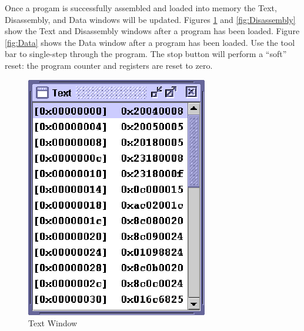 \documentclass[]{spie}
\begin{document}
Once a progam is successfully assembled and loaded into memory the Text, Disassembly, and Data windows will be updated.
Figures \ref{fig:Text} and \ref{fig:Disassembly} show the Text and Disassembly windows after a program has been loaded.
Figure \ref{fig:Data} shows the Data window after a program has been loaded. Use the tool bar to single-step through the program.
The stop button will perform a ``soft'' reset: the program counter and registers are reset to zero.

\begin{center}
\begin{figure}[H]	
	\begin{center}
	\begin{minipage}[H]{2.4in}
		\begin{center}
			\includegraphics{graphics/TextWindow.eps}
		\end{center}
		
		\caption{\label{fig:Text} Text Window}
		

\end{minipage}
\end{center}
\end{figure}
\end{center}
\end{document}
